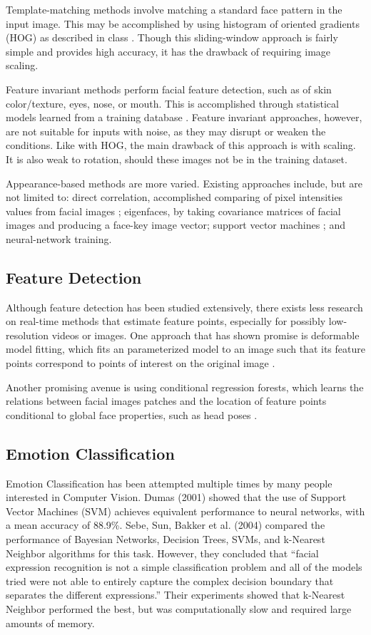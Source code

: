 \documentclass[10pt,twocolumn,letterpaper]{article}
\begin{document}
Template-matching methods involve matching a standard face pattern in the input image. This may be accomplished by using histogram of oriented gradients (HOG) as described in class \cite{Xiao}. Though this sliding-window approach is fairly simple and provides high accuracy, it has the drawback of requiring image scaling.

Feature invariant methods perform facial feature detection, such as of skin color/texture, eyes, nose, or mouth. This is accomplished through statistical models learned from a training database \cite{Hotta}. Feature invariant approaches, however, are not suitable for inputs with noise, as they may disrupt or weaken the conditions. Like with HOG, the main drawback of this approach is with scaling. It is also weak to rotation, should these images not be in the training dataset.

Appearance-based methods are more varied. Existing approaches include, but are not limited to: direct correlation, accomplished comparing of pixel intensities values from facial images \cite{Heseltine}; eigenfaces, by taking covariance matrices of facial images and producing a face-key image vector; support vector machines \cite{Heisele}; and neural-network training.

\subsection{Feature Detection}

Although feature detection has been studied extensively, there exists less research on real-time methods that estimate feature points, especially for possibly low-resolution videos or images.
One approach that has shown promise is deformable model fitting, which fits an parameterized model to an image such that its feature points correspond to points of interest on the original image \cite{Saragih}. 

Another promising avenue is using conditional regression forests, which learns the relations between facial images patches and the location of feature points conditional to global face properties, such as head poses \cite{Dantone}.

\subsection{Emotion Classification}

Emotion Classification has been attempted multiple times by many people interested in Computer Vision. Dumas (2001) showed that the use of Support Vector Machines (SVM) achieves equivalent performance to neural networks, with a mean accuracy of 88.9\%. Sebe, Sun, Bakker et al. (2004) compared the performance of Bayesian Networks, Decision Trees, SVMs, and k-Nearest Neighbor algorithms for this task. However, they concluded that ``facial expression recognition is not a simple classification problem and all of the models tried were not able to entirely capture the complex decision boundary that separates the different expressions.'' Their experiments showed that k-Nearest Neighbor performed the best, but was computationally slow and required large amounts of memory. 
\end{document}
